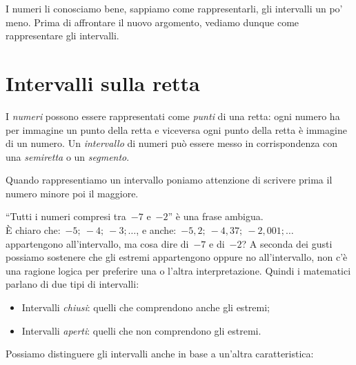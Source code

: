 I numeri li conosciamo bene, sappiamo come rappresentarli, gli intervalli
un po' meno.
Prima di affrontare il nuovo argomento, vediamo dunque come rappresentare 
gli intervalli.

\section{Intervalli sulla retta}
\label{sec:dis_intervalli}
I \emph{numeri} possono essere rappresentati come \emph{punti} di una 
retta: ogni numero ha per immagine un punto della retta e viceversa ogni 
punto della retta è immagine di un numero. 
Un \emph{intervallo} di numeri può essere messo in corrispondenza con una 
\emph{semiretta} o un \emph{segmento}.


\begin{osservazione}{}{} 
Quando rappresentiamo un intervallo poniamo 
attenzione di 
scrivere prima il numero minore poi il maggiore.
\end{osservazione}

``Tutti i numeri compresi tra~\(-7\) e~\(-2\)'' è una frase ambigua.\\ 
È chiaro che:~\(-5;~-4;~-3; \dots\), 
e anche:~\(-5,2;~-4,37;~-2,001; \dots\) 
appartengono all'intervallo, ma cosa dire di~\(-7\) e di~\(-2\)? 
A seconda dei gusti possiamo sostenere che gli estremi appartengono 
oppure no all'intervallo, non c'è una ragione logica per preferire una 
o l'altra interpretazione. 
Quindi i matematici parlano di due tipi di intervalli: 

\begin{itemize} [noitemsep]
 \item Intervalli \emph{chiusi}: quelli che comprendono anche gli estremi;
 \item Intervalli \emph{aperti}: quelli che non comprendono gli estremi.
\end{itemize}
Possiamo distinguere gli intervalli anche in base a un'altra 
caratteristica:


